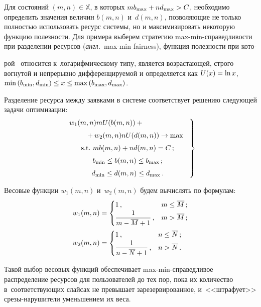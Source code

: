 \begin{multicols}{2}
  Для состояний $(m,n)\in \mathbb{X}$, в которых $mb_{\max}\hm+ 
nd_{\max}\hm> C$, необходимо определить значения величин $b(m,n)$ 
и~$d(m,n)$, позволяющие не только полностью использовать ресурс 
системы, но и максимизировать некоторую функцию по\-лез\-ности. Для 
примера выберем стратегию max-min-справедливости при разделении 
ресурсов (\textit{англ.}\  
max-min fairness), функция полезности при кото-\linebreak
\vspace*{-12pt}
\columnbreak

\noindent
рой~\cite{11-mos} относится 
к~логарифмическому типу, является возрастающей, строго вогнутой и 
непрерывно дифференцируемой и определяется как $U(x)\hm= \ln x$, $\min 
\left( b_{\min}, d_{\min}\right)\hm\leq x\hm\leq \max\left( b_{\max}, 
d_{\max}\right)$. 
  
  Разделение ресурса между заявками в системе соответствует решению 
следующей задачи оптимизации:
  \begin{equation}
  \left.
  \begin{array}{c}
  w_1(m,n) mU(b(m,n))+{}\hspace*{60pt}\\[6pt]
  \hspace*{20pt}{}+w_2(m,n) nU(d(m,n))\to \max\\[6pt]
  \mbox{s.t.}\ mb(m,n)+nd(m,n)=C\,;\\[6pt]
  b_{\min} \leq b(m,n)\leq b_{\max}\,;\\[6pt]
  d_{\min}\leq d(m,n)\leq d_{\max}\,.
  \end{array}
  \right\}
  \label{e4-mos}
  \end{equation}

Весовые функции $w_1(m,n)$ и~$w_2(m,n)$ будем вычислять по формулам: 
\begin{align*}
w_1(m,n) &=\begin{cases}
1\,, & m\leq \overline{M}\,;\\
\displaystyle\frac{\displaystyle 1\mathstrut}{\displaystyle m-\overline{M}+1\mathstrut}\,,& m>\overline{M}\,;
\end{cases}\\
w_2(m,n) &=\begin{cases}
1\,, & n\leq \overline{N}\,;\\
\displaystyle\frac{\displaystyle 1\mathstrut}{\displaystyle n-\overline{N}+1\mathstrut}\,, & n>\overline{N}\,.
\end{cases}
\end{align*}
  
  Такой выбор весовых функций обеспечивает max-min-спра\-вед\-ли\-вое 
распределение ресурсов для пользователей до тех пор, пока их количество 
в~соответствующих слайсах не превышает зарезервированное, 
и~<<штрафует>>  
сре\-зы-на\-ру\-ши\-те\-ли уменьшением их веса. 
  

\end{multicols}
